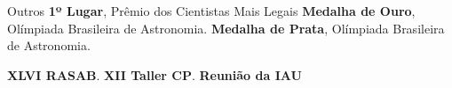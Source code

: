 \begin{rubric}{Outros}
\entry*[2026] \textbf{1º Lugar}, Prêmio dos Cientistas Mais Legais
\entry*[2022] \textbf{Medalha de Ouro}, Olímpiada Brasileira de Astronomia.
%
\entry*[2021] \textbf{Medalha de Prata}, Olímpiada Brasileira de Astronomia.

\entry*[2023] \textbf{XLVI RASAB}.
\entry*[2024] \textbf{XII Taller CP}.
\entry*[2025] \textbf{Reunião da IAU}

\end{rubric}

